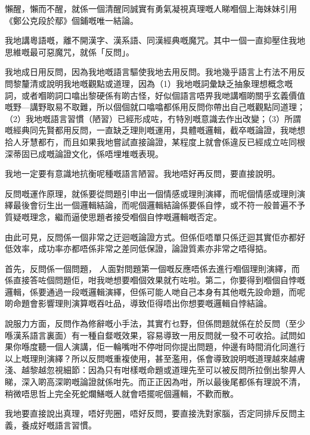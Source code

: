 懶醒，懶而不醒，就係一個清醒同誠實有勇氣凝視真理嘅人睇嗰個上海妹妹引用《鄭公克段於鄢》個鋪嘅唯一結論。


我地講粵語嘅，離不開漢字、漢系語、同漢經典嘅魔咒。其中一個一直抑壓住我地思維嘅最可惡魔咒，就係「反問」。

我地成日用反問，因為我地嘅語言驅使我地去用反問。我地幾乎語言上冇法不用反問黎釐清或說明我地嘅觀點或道理，因為（1）我地嘅詞彙缺乏抽象理想概念嘅詞，或者嗰啲詞口噏出黎硬係有啲古怪，好似個語言唔畀我哋講嗰啲關乎玄義價值嘅野—講野取易不取難，所以個個就口噏噏都係用反問你帶出自己嘅觀點同道理；（2）我地嘅語言習慣（陋習）已經形成咗，冇特別嘅意識去作出改變；（3）所謂嘅經典同先賢都用反問，一直缺乏理則嘅運用，具體嘅邏輯，截卒嘅論證，我哋想拾人牙慧都冇，而且如果我地嘗試直接論證，某程度上就會係違反已經成立咗同根深蒂固已成嘅論證文化，係唔埋堆嘅表現。

我地一定要有意識地抗衡呢種嘅語言陋習。我地唔好再反問，要直接說明。

反問嘅運作原理，就係要從問題引申出一個情感或理則演繹，而呢個情感或理則演繹最後會衍生出一個邏輯結論，而呢個邏輯結論係要係自悖，或不符一般普遍不予質疑嘅理念，繼而逼使思題者接受嗰個自悖嘅邏輯嘅否定。

由此可見，反問係一個非常之迂迴嘅論證方式。但係佢唔單只係迂迴其實佢亦都好低效率，成功率亦都唔係非常之差同低保證，論證質素亦非常之唔得掂。

首先，反問係一個問題， 人面對問題第一個嘅反應唔係去進行嗰個理則演繹，而係直接答咗個問題佢，咁我哋想要嗰個效果就冇咗啦。第二，你要得到嗰個自悖嘅邏輯，係要通過一段嘅邏輯演繹，但係可能人哋自己本身有其他嘅先設命題，而呢啲命題會影響理則演算嘅吞吐品，導致佢得唔出你想要嘅邏輯自悖結論。

說服力方面，反問作為修辭嘅小手法，其實冇乜野，但係問題就係在於反問（至少喺漢系語言裏面）有一種自韰嘅效果，容易導致一用反問就一發不可收拾。試問如果你喺度聽一個人演講，佢一輪嘴咁不停咁同你提出問題，仲邊有時間消化同進行以上嘅理則演繹？所以反問嘅重複使用，甚至濫用，係會導致說明嘅道理越來越膚淺、越黎越忽視細節：因為只有咁樣嘅命題或道理先至可以被反問所拉倒出黎畀人睇，深入啲高深啲嘅論證就係咁先。而正正因為咁，所以最後尾都係有理說不清，稍微唔思哲上完全死蛇爛鱔嘅人就會唔擺呢個邏輯，不歡而散。

我地要直接說出真理，唔好兜圈，唔好反問，要直接洗對家腦，否定同排斥反問主義，養成好嘅語言習慣。
